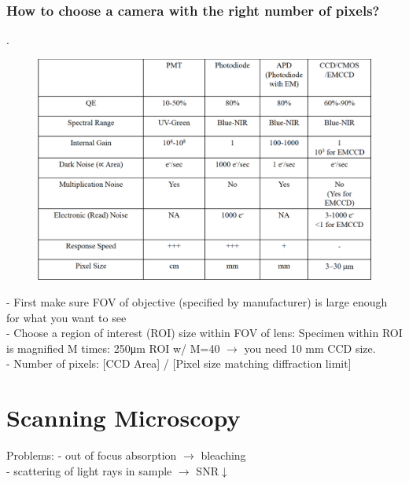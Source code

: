 \documentclass[9pt]{article}
\begin{document}
\begin{multicols}{2}
\subsubsection{How to choose a camera with the right number of pixels?}.\\
\begin{figure}
\includegraphics[scale=0.1]{Images/comparison_detectors.png}
 \end{figure}
- First make sure FOV of objective (specified by manufacturer) is large enough for what you want to see\\
- Choose a region of interest (ROI) size within FOV of lens: Specimen within ROI is magnified M times: 250\si{\micro\meter} ROI w/ M=40 $\rightarrow$ you need 10 mm CCD size.\\
- Number of pixels: [CCD Area] / [Pixel size matching diffraction limit]\\
\section{Scanning Microscopy}
Problems: - out of focus absorption $\rightarrow$ bleaching \\
- scattering of light rays in sample $\rightarrow$ SNR$\downarrow$

\end{multicols}
\end{document}
